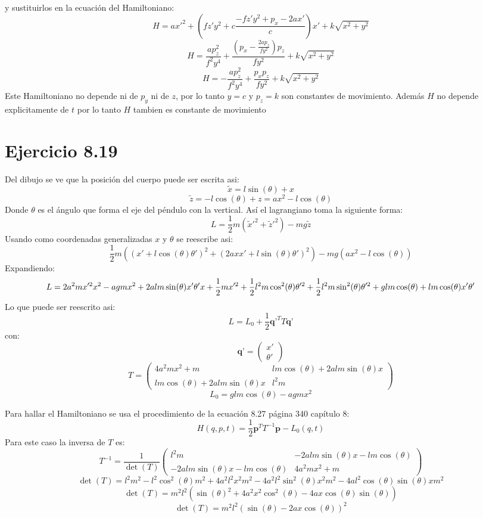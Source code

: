 \documentclass[letterpaper,10pt]{article}
\begin{document}
y sustituirlos en la ecuaci\'on del Hamiltoniano:
$$
H=a x'^2+\left(f z' y^2+c \frac{-f z' y^2+p_x-2 a x'}{c}\right) x'+k \sqrt{x^2+y^2}$$ $$
H=\frac{a p_z^2}{f^2 y^4}+\frac{\left(p_x-\frac{2 a p_z}{f y^2}\right) p_z}{f y^2}+k \sqrt{x^2+y^2}$$ $$
H=-\frac{a p_z^2}{f^2 y^4}+\frac{p_x p_z}{f y^2}+k \sqrt{x^2+y^2}
$$
Este Hamiltoniano no depende ni de $p_y$ ni de $z$, por lo tanto $y=c$ y $p_z=k$ son constantes de movimiento. Adem\'as $H$ no depende explicitamente de $t$ por lo tanto $H$ tambien es constante de movimiento


\section*{Ejercicio 8.19}
Del dibujo se ve que la posici\'on del cuerpo puede ser escrita asi:
$$
\tilde{x}=l \sin (\theta )+x$$ $$
\tilde{z}=-l \cos (\theta )+z=a x^2-l \cos (\theta )
$$
Donde $\theta$ es el \'angulo que forma el eje del p\'endulo con la vertical. As\'i el lagrangiano toma la siguiente forma:
$$
L=\frac{1}{2} m \left(\tilde{x}'^2+\tilde{z}'^2\right)-m g \tilde{z}
$$
Usando como coordenadas generalizadas $x$ y $\theta $ se reescribe asi:
$$
\frac{1}{2} m \left(\left(x'+l \cos (\theta ) \theta '\right)^2+\left(2 a x x'+l
   \sin (\theta ) \theta '\right)^2\right)- m g \left(a x^2-l \cos (\theta )\right)
$$
Expandiendo:
$$
L=2 a^2 m x'^2 x^2-a g m x^2+2 a l m \sin (\theta ) x' \theta ' x+\frac{1}{2}
   m x'^2+\\ \frac{1}{2} l^2 m \cos ^2(\theta ) \theta '^2+\frac{1}{2} l^2 m \sin ^2(\theta
   ) \theta '^2+g l m \cos (\theta )+l m \cos (\theta ) x' \theta '
$$
Lo que puede ser reescrito asi:
$$
L=L_0+\frac{1}{2} \textbf{q'}^T T \textbf{q'}
$$
con:
$$
\textbf{q'}=\left(
\begin{array}{l}%
x'\\
\theta'
\end{array} \right)$$ $$
T=
\left(
\begin{array}{ll}
 4 a^2 m x^2+m & l m \cos (\theta )+2 a l m \sin (\theta ) x \\
 l m \cos (\theta )+2 a l m \sin (\theta ) x & l^2 m
\end{array}
\right)$$ $$
L_0=g l m \cos (\theta )-a g m x^2 $$

Para hallar el Hamiltoniano se usa el procedimiento  de la ecuaci\'on 8.27 p\'agina 340 cap\'itulo 8:
$$
H(q,p,t)=\frac{1}{2} \textbf{p}^T T^{-1} \textbf{p}-L_0(q,t)
$$
Para este caso la inversa de $T$ es:
$$
T^{-1}=\frac{1}{\det(T)} \left(
\begin{array}{ll}
 l^2 m & -2 a l m \sin (\theta ) x-l m \cos (\theta ) \\
 -2 a l m \sin (\theta ) x-l m \cos (\theta ) & 4 a^2 m x^2+m
\end{array}
\right)$$ $$
\det(T)=l^2 m^2-l^2 \cos ^2(\theta ) m^2+4 a^2 l^2 x^2 m^2-4 a^2 l^2 \sin ^2(\theta ) x^2
   m^2-4 a l^2 \cos (\theta ) \sin (\theta ) x m^2 $$ $$
\det(T)=m^2 l^2 (\sin(\theta)^2+4 a^2 x^2 \cos^2(\theta)-4 a x \cos (\theta ) \sin (\theta ) )$$ $$
\det(T)=m^2 l^2 (\sin(\theta)-2 a x \cos(\theta))^2
$$
\end{document}
